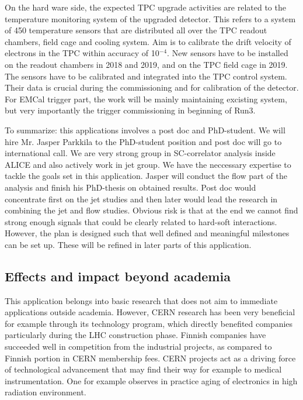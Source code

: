 On the hard ware side, the expected TPC upgrade activities are related to the temperature monitoring system of the upgraded detector. This refers to a system of 450 temperature sensors that are distributed all over the TPC readout chambers, field cage and cooling system. Aim is to calibrate the drift velocity of electrons in the TPC within accuracy of 10$^{-4}$. New sensors have to be installed on the readout chambers in 2018 and 2019, and on the TPC field cage in 2019. The sensors have to be calibrated and integrated into the TPC control system. Their data is crucial during the commissioning and for calibration of the detector. For EMCal trigger part, the work will be mainly maintaining excisting system, but very importantly the trigger commissioning in beginning of Run3.

To summarize: this applications involves a post doc and PhD-student. We will hire Mr. Jasper Parkkila to the PhD-student position and post doc will go to international call. We are very strong group in SC-correlator analysis inside ALICE and also actively work in jet group. We have the neccessary expertise to tackle the goals set in this application. Jasper will conduct the flow part of the analysis and finish his PhD-thesis on obtained results. Post doc would concentrate first on the jet studies and then later would lead the research in combining the jet and flow studies. Obvious risk is that at the end we cannot find strong enough signals that could be clearly related to hard-soft interactions. However, the plan is designed such that well defined and meaningful milestones can be set up. These will be refined in later parts of this application.

\subsection{Effects and impact beyond academia}

This application belongs into basic research that does not aim to immediate applications outside academia. However, CERN research has been very beneficial for example through its technology program, which directly benefited companies particularly during the LHC construction phase. Finnish companies have succeeded well in competition from the industrial projects, as compared to Finnish portion in CERN membership fees. CERN projects act as a driving force of technological advancement that may find their way for example to medical instrumentation. One for example observes in practice aging of electronics in high radiation environment.


